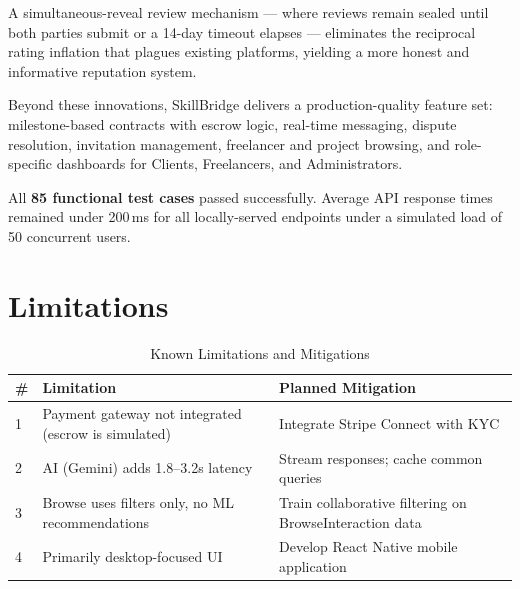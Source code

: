 \vspace{0.5em}
\begin{infobox}
A simultaneous-reveal review mechanism — where reviews remain sealed until both parties
submit or a 14-day timeout elapses — eliminates the reciprocal rating inflation that
plagues existing platforms, yielding a more honest and informative reputation system.
\end{infobox}

\vspace{0.8em}
Beyond these innovations, SkillBridge delivers a production-quality feature set:
milestone-based contracts with escrow logic, real-time messaging, dispute resolution,
invitation management, freelancer and project browsing, and role-specific dashboards
for Clients, Freelancers, and Administrators.

All \textbf{85 functional test cases} passed successfully. Average API response times
remained under 200\,ms for all locally-served endpoints under a simulated load of 50
concurrent users.

\section{Limitations}

\begin{table}[h]
\centering
\caption{Known Limitations and Mitigations}
\label{tab:limitations}
\renewcommand{\arraystretch}{1.5}
\begin{tabularx}{\textwidth}{|p{0.5cm}|p{5cm}|X|}
\hline
\rowcolor{sblight}
\textbf{\#} & \textbf{Limitation} & \textbf{Planned Mitigation} \\ \hline
1 & Payment gateway not integrated (escrow is simulated) & Integrate Stripe Connect with KYC \\ \hline
2 & AI (Gemini) adds 1.8--3.2s latency & Stream responses; cache common queries \\ \hline
3 & Browse uses filters only, no ML recommendations & Train collaborative filtering on BrowseInteraction data \\ \hline
4 & Primarily desktop-focused UI & Develop React Native mobile application \\ \hline
\end{tabularx}
\end{table}

